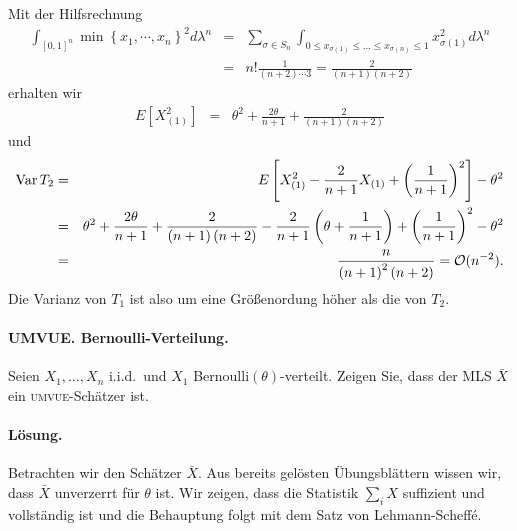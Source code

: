 Mit der Hilfsrechnung
\begin{eqnarray}
	\int_{[0,1]^n}^{} \min\left\{ x_1,\cdots,x_n \right\}^2 d\lambda^n 
	&=& \sum_{\sigma\in S_n}^{} \int_{0\leq x_{\sigma(1)}\leq \ldots \leq x_{\sigma(n)}\leq 1} x_{\sigma(1)}^2 d\lambda^n \\
	&=& n! \frac{1}{\left( n+2 \right)\cdots 3} = \frac{2}{\left( n+1 \right)\left( n+2 \right)}
\end{eqnarray}
erhalten wir
\begin{eqnarray}
	E\left[ X_{(1)}^2 \right] &=& \theta^2 +  \frac{2\theta}{n+1} + \frac{2}{\left( n+1 \right)\left( n+2 \right)}
\end{eqnarray}
und
\begin{eqnarray}
	\operatorname{Var} T_2 &=& E \left[ X_{(1)}^2 - \frac{2}{n+1}X_{(1)}+ \left( \frac{1}{n+1} \right)^2 \right] -\theta^2 \\
	&=& \theta^2 + \frac{2\theta}{n+1} + \frac{2}{\left( n+1 \right)\left( n+2 \right)} 
	- \frac{2}{n+1}\left( \theta + \frac{1}{n+1} \right) + \left( \frac{1}{n+1} \right)^2 -\theta^2 \\
	&=& \frac{n}{\left( n+1 \right)^2 \left( n+2 \right)} = \mathcal O (n^{-2}).
\end{eqnarray}
Die Varianz von $T_1$ ist also um eine Größenordung höher als die von $T_2$.




\paragraph{UMVUE. Bernoulli-Verteilung. } 
Seien $X_1,\ldots,X_n$ i.i.d.\ und $X_1$ Bernoulli$(\theta)$-verteilt. Zeigen
Sie, dass der MLS $\bar X$ ein \textsc{umvue}-Schätzer ist.

\paragraph*{Lösung. } Betrachten wir den Schätzer $\bar X$. Aus bereits
gelösten Übungsblättern wissen wir, dass $\bar X$ unverzerrt für $\theta$ ist.
Wir zeigen, dass die Statistik $\sum_{i}^{} X$ suffizient und vollständig ist
und die Behauptung folgt mit dem Satz von Lehmann-Scheff\'e. 

